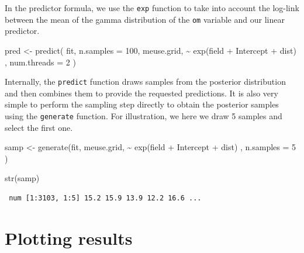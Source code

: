 \documentclass[
  a4paper,
]{article}
\newenvironment{Shaded}{\begin{snugshade}}{\end{snugshade}}
\newcommand{\AttributeTok}[1]{\textcolor[rgb]{0.40,0.45,0.13}{#1}}
\newcommand{\DecValTok}[1]{\textcolor[rgb]{0.68,0.00,0.00}{#1}}
\newcommand{\FunctionTok}[1]{\textcolor[rgb]{0.28,0.35,0.67}{#1}}
\newcommand{\NormalTok}[1]{\textcolor[rgb]{0.00,0.23,0.31}{#1}}
\newcommand{\OtherTok}[1]{\textcolor[rgb]{0.00,0.23,0.31}{#1}}
\newcommand{\SpecialCharTok}[1]{\textcolor[rgb]{0.37,0.37,0.37}{#1}}
\begin{document}
In the predictor formula, we use the \texttt{exp} function to take into
account the log-link between the mean of the gamma distribution of the
\texttt{om} variable and our linear predictor.

\begin{Shaded}
\begin{Highlighting}[]
\NormalTok{pred }\OtherTok{\textless{}{-}} \FunctionTok{predict}\NormalTok{(}
\NormalTok{  fit,}
  \AttributeTok{n.samples =} \DecValTok{100}\NormalTok{,}
\NormalTok{  meuse.grid,}
  \SpecialCharTok{\textasciitilde{}} \FunctionTok{exp}\NormalTok{(field }\SpecialCharTok{+}\NormalTok{ Intercept }\SpecialCharTok{+}\NormalTok{ dist) ,}
  \AttributeTok{num.threads =} \DecValTok{2}
\NormalTok{)}
\end{Highlighting}
\end{Shaded}

Internally, the \texttt{predict} function draws samples from the
posterior distribution and then combines them to provide the requested
predictions. It is also very simple to perform the sampling step
directly to obtain the posterior samples using the \texttt{generate}
function. For illustration, we here we draw 5 samples and select the
first one.

\begin{Shaded}
\begin{Highlighting}[]
\NormalTok{samp }\OtherTok{\textless{}{-}} \FunctionTok{generate}\NormalTok{(fit, }
\NormalTok{                 meuse.grid,}
                 \SpecialCharTok{\textasciitilde{}} \FunctionTok{exp}\NormalTok{(field }\SpecialCharTok{+}\NormalTok{ Intercept }\SpecialCharTok{+}\NormalTok{ dist) ,}
                 \AttributeTok{n.samples =} \DecValTok{5}
\NormalTok{)}

\FunctionTok{str}\NormalTok{(samp)}
\end{Highlighting}
\end{Shaded}

\begin{verbatim}
 num [1:3103, 1:5] 15.2 15.9 13.9 12.2 16.6 ...
\end{verbatim}

\begin{Shaded}
\end{Shaded}

\hypertarget{plotting-results}{%
\section{Plotting results}\label{plotting-results}}
\end{document}
